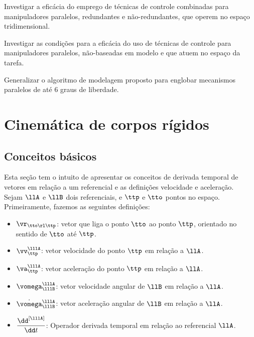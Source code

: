 \documentclass[]{politex}
\begin{document}
Investigar a eficácia do emprego de técnicas de controle combinadas para manipuladores paralelos, redundantes e não-redundantes, que operem no espaço tridimensional.

\vspace{0.3cm}

Investigar as condições para a eficácia do uso de técnicas de controle para manipuladores paralelos, não-baseadas em modelo e que atuem no espaço da tarefa.

\vspace{0.3cm}

Generalizar o algoritmo de modelagem proposto para englobar mecanismos paralelos de até 6 graus de liberdade.




%






\apendice

\chapter{Cinemática de corpos rígidos} \label{apendiceA}

\section{Conceitos básicos}

Esta seção tem o intuito de apresentar os conceitos de derivada temporal de vetores em relação a um referencial e as definições velocidade e aceleração. \\

Sejam $\llA$ e $\llB$ dois referenciais, e $\ttp$ e $\tto$ pontos no espaço. Primeiramente, fazemos as seguintes definições:

\begin{itemize}
\item $\vr_{\tto \rl \ttp}$: vetor que liga o ponto $\tto$ ao ponto $\ttp$, orientado no sentido de $\tto$ até $\ttp$.
\item $\vv_{\ttp}^{\lllA}$: vetor velocidade do ponto $\ttp$ em relação a $\llA$.
\item $\va_{\ttp}^{\lllA}$: vetor acelera\c{c}\~ao do ponto $\ttp$ em relação a $\llA$.
\item $\vomega_{\lllB}^{\lllA}$: vetor velocidade angular de $\llB$ em relação a $\llA$.
\item $\dot{\vomega}_{\lllB}^{\lllA}$: vetor aceleração angular de $\llB$ em relação a $\llA$.
\item $\displaystyle\frac{\dd^{[\lllA]}}{\dd t}$: Operador derivada temporal em relação ao referencial $\llA$.
\end{itemize}
\end{document}
